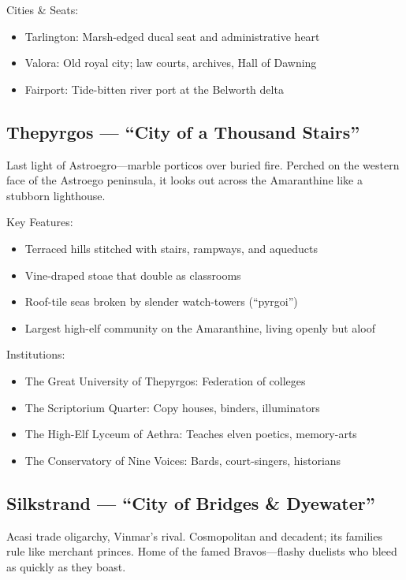 Cities \& Seats:
\begin{itemize}
    \item Tarlington: Marsh-edged ducal seat and administrative heart
    \item Valora: Old royal city; law courts, archives, Hall of Dawning
    \item Fairport: Tide-bitten river port at the Belworth delta
\end{itemize}

\subsection{Thepyrgos --- ``City of a Thousand Stairs''}
\label{sec:thepyrgos}

Last light of Astroegro---marble porticos over buried fire. Perched on the western face of the Astroego peninsula, it looks out across the Amaranthine like a stubborn lighthouse.

Key Features:
\begin{itemize}
    \item Terraced hills stitched with stairs, rampways, and aqueducts
    \item Vine-draped stoae that double as classrooms
    \item Roof-tile seas broken by slender watch-towers (``pyrgoi'')
    \item Largest high-elf community on the Amaranthine, living openly but aloof
\end{itemize}

Institutions:
\begin{itemize}
    \item The Great University of Thepyrgos: Federation of colleges
    \item The Scriptorium Quarter: Copy houses, binders, illuminators
    \item The High-Elf Lyceum of Aethra: Teaches elven poetics, memory-arts
    \item The Conservatory of Nine Voices: Bards, court-singers, historians
\end{itemize}

\subsection{Silkstrand --- ``City of Bridges \& Dyewater''}
\label{sec:silkstrand}

Acasi trade oligarchy, Vinmar's rival. Cosmopolitan and decadent; its families rule like merchant princes. Home of the famed Bravos---flashy duelists who bleed as quickly as they boast.

